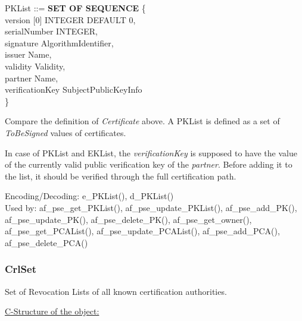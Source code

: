 {\small
\bvtab
\3 PKList ::= \3 {\bf SET OF SEQUENCE} \{  \\
\7 version [0]     \3 INTEGER DEFAULT 0,       \\
\7 serialNumber    \3 INTEGER,                 \\
\7 signature       \3 AlgorithmIdentifier,     \\
\7 issuer          \3 Name,                    \\
\7 validity        \3 Validity,                \\
\7 partner         \3 Name,                    \\
\7 verificationKey \3 SubjectPublicKeyInfo \\
\6 \}
\evtab
}
 
Compare the definition of {\em Certificate} above. A PKList is defined
as a set of {\em ToBeSigned} values of certificates.
 
In case of PKList and EKList, the {\em verificationKey} is supposed to have the value
of the currently valid public verification key of the {\em partner}.
Before adding it to the list, it should be verified through
the full certification path.


Encoding/Decoding: e\_PKList(), d\_PKList() \\
Used by: af\_pse\_get\_PKList(), af\_pse\_update\_PKList(), af\_pse\_add\_PK(), af\_pse\_update\_PK(),
af\_pse\_delete\_PK(), af\_pse\_get\_owner(), af\_pse\_get\_PCAList(), af\_pse\_update\_PCAList(),
af\_pse\_add\_PCA(), af\_pse\_delete\_PCA()


\subsubsection{CrlSet}
Set of Revocation Lists of all known certification authorities.
 
\underline{C-Structure of the object:}

